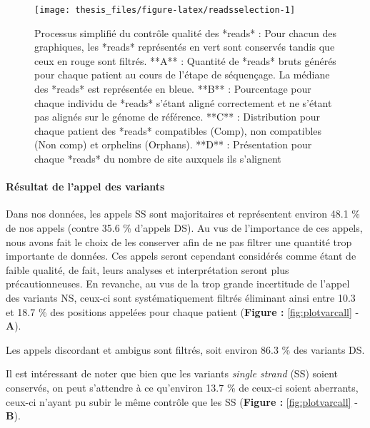 \documentclass[12pt,twoside]{reedthesis}
\theoremstyle{definition}
\theoremstyle{definition}
\theoremstyle{remark}
\begin{document}
  \newpage
  
  \begin{figure}
  
  {\centering \texttt{[image: thesis\_files/figure-latex/readsselection-1]} 
  
  }
  
  \caption[Processus simplifié du contrôle qualité des *reads*]{Processus simplifié du contrôle qualité des *reads* : Pour chacun des graphiques, les *reads* représentés en vert sont conservés tandis que ceux en rouge sont filtrés. **A** : Quantité de *reads* bruts générés pour chaque patient au cours de l'étape de séquençage. La médiane des *reads* est représentée en bleue. **B** : Pourcentage pour chaque individu de *reads* s'étant aligné correctement et ne s'étant pas alignés sur le génome de référence. **C** : Distribution pour chaque patient des *reads* compatibles (Comp), non compatibles (Non comp) et orphelins (Orphans). **D** : Présentation pour chaque *reads* du nombre de site auxquels ils s'alignent}\label{fig:readsselection}
  \end{figure}
  
  \newpage
  
  \paragraph{Résultat de l'appel des
  variants}\label{resultat-de-lappel-des-variants}
  
  Dans nos données, les appels SS sont majoritaires et représentent
  environ 48.1 \% de nos appels (contre 35.6 \% d'appels DS). Au vus de
  l'importance de ces appels, nous avons fait le choix de les conserver
  afin de ne pas filtrer une quantité trop importante de données. Ces
  appels seront cependant considérés comme étant de faible qualité, de
  fait, leurs analyses et interprétation seront plus précautionneuses. En
  revanche, au vus de la trop grande incertitude de l'appel des variants
  NS, ceux-ci sont systématiquement filtrés éliminant ainsi entre 10.3 et
  18.7 \% des positions appelées pour chaque patient (\textbf{Figure :
  }\ref{fig:plotvarcall} - \textbf{A}).
  
  Les appels discordant et ambigus sont filtrés, soit environ 86.3 \% des
  variants DS.
  
  Il est intéressant de noter que bien que les variants \emph{single
  strand} (SS) soient conservés, on peut s'attendre à ce qu'environ 13.7
  \% de ceux-ci soient aberrants, ceux-ci n'ayant pu subir le même
  contrôle que les SS (\textbf{Figure : }\ref{fig:plotvarcall} -
  \textbf{B}).
  
\end{document}
